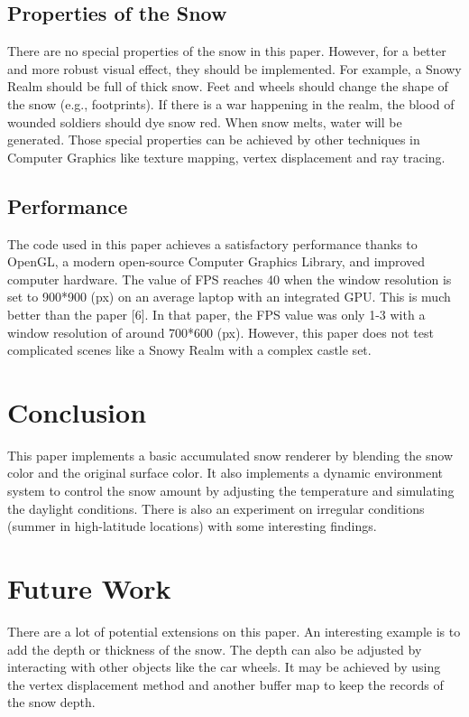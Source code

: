\documentclass{article}
\begin{document}
\subsection {Properties of the Snow}
There are no special properties of the snow in this paper. However, for a better and more robust visual effect, they should be 
implemented. For example, a Snowy Realm should be full of thick snow. Feet and wheels should change the shape of the snow (e.g.,
footprints). If there is a war happening in the realm, the blood of wounded soldiers should dye snow red. When snow melts, water 
will be generated. Those special properties can be achieved by other techniques in Computer Graphics like texture mapping, vertex
displacement and ray tracing.

\subsection {Performance}
The code used in this paper achieves a satisfactory performance thanks to OpenGL, a modern open-source Computer Graphics Library, 
and improved computer hardware. The value of FPS reaches 40 when the window resolution is set to 900*900 (px) on an average laptop 
with an integrated GPU. This is much better than the paper [6]. In that paper, the FPS value was only 1-3 with a window resolution of 
around 700*600 (px). However, this paper does not test complicated scenes like a Snowy Realm with a complex castle set.

\section{Conclusion}
This paper implements a basic accumulated snow renderer by blending the snow color and the original surface color. It also implements 
a dynamic environment system to control the snow amount by adjusting the temperature and simulating the daylight conditions. There is 
also an experiment on irregular conditions (summer in high-latitude locations) with some interesting findings. 

\section{Future Work}
There are a lot of potential extensions on this paper. An interesting example is to add the depth or thickness of the snow. The depth 
can also be adjusted by interacting with other objects like the car wheels. It may be achieved by using the vertex displacement method 
and another buffer map to keep the records of the snow depth.
\end{document}
